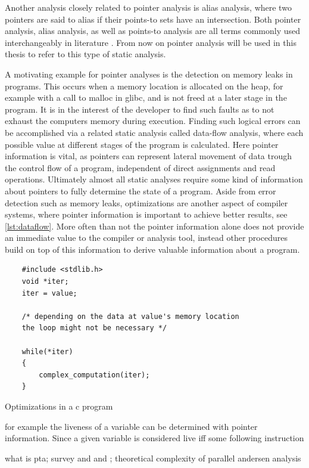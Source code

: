 Another analysis closely related to pointer analysis is alias analysis, where two pointers are said to alias if their points-to sets have an intersection. Both pointer analysis, alias analysis, as well as points-to analysis are all terms commonly used interchangeably in literature \cite{hind2001pointer}. From now on pointer analysis will be used in this thesis to refer to this type of static analysis.

A motivating example for pointer analyses is the detection on memory leaks in programs.
This occurs when a memory location is allocated on the heap, for example with a call to malloc in glibc, and is not freed at a later stage in the program.
It is in the interest of the developer to find such faults as to not exhaust the computers memory during execution.
Finding such logical errors can be accomplished via a related static analysis called data-flow analysis, where each possible value at different stages of the program is calculated. Here pointer information is vital, as pointers can represent lateral movement of data trough the control flow of a program, independent of direct assignments and read operations. Ultimately almost all static analyses require some kind of information about pointers to fully determine the state of a program.
Aside from error detection such as memory leaks, optimizations are another aspect of compiler systems, where pointer information is important to achieve better results, see \autoref{lst:dataflow}.
More often than not the pointer information alone does not provide an immediate value to the compiler or analysis tool, instead other procedures build on top of this information to derive valuable information about a program.

\begin{listing}
    \begin{verbatim}
    #include <stdlib.h>
    void *iter;
    iter = value;

    /* depending on the data at value's memory location 
    the loop might not be necessary */
    
    while(*iter)
    {
        complex_computation(iter);
    }
    \end{verbatim}
    \caption{Optimizations in a c program}
    \label{lst:dataflow}
\end{listing}

for example the liveness of a variable can be determined with pointer information. Since a given variable is considered live iff some following instruction

what is pta; survey \cite{hind2001pointer} and \cite{toman2017taming} and \cite{smaragdakis2015pointer}; theoretical complexity of parallel andersen analysis \cite{mathiasen2021fine}

